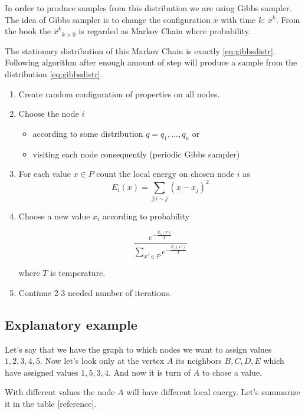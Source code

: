 \documentclass[12pt]{report}
\begin{document}
In order to produce samples from this distribution we are using Gibbs sampler. The idea of Gibbs sampler is to change the configuration $\bar{x}$ with time $k$: $ \bar{x}^k $.
From the book \cite{bremaud2013markov} the $ {\bar{x}^k}_{k > 0}$ is regarded as Markov Chain where
probability.

The stationary distribution of this Markov Chain is exactly \ref{eq:gibbsdistr}.
Following algorithm after enough amount of step will produce a sample from the distribution \ref{eq:gibbsdistr}.

\begin{enumerate}
  \item Create random configuration of properties on all nodes.
  \item Choose the node $i$
  
 	 \begin{itemize}
		\item according to some distribution $q = q_1, ..., q_n$ or
		\item visiting each node consequently (periodic Gibbs sampler)
 	 \end{itemize}
  
  \item For each value $x \in P$ count the local energy on chosen node $i$ as 
  $$ E_i(x) = \sum\limits_{j | i \sim j}  (x - x_j)^2 $$  
  
  \item Choose a new value $x_i$ according to probability
  
  $$ \frac{ e^{-\frac{E_i(x)}{T}} }{ \sum\limits_{x'\in P} e^{-\frac{E_i(x')}{T}}} $$
  
	where $T$ is temperature.
\item Continue 2-3 needed number of iterations.
\end{enumerate}





\subsection{Explanatory example} 

Let's say that we have the graph to which nodes we want to assign values $1, 2, 3, 4, 5$. Now let's look only at the vertex $A$ its neighbors $B, C, D, E$ which have assigned values $1, 5, 3, 4$. And now it is turn of $A$ to chose a value.

With different values the node $A$ will have different local energy. Let's summarize it in the table [reference].
\end{document}
